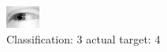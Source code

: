 \begin{figure}[h!]
\begin{center}
\includegraphics[width=0.60\columnwidth]{figures/ID2443_class_3_target_4.png}
\end{center}
\caption{ Classification: 3 actual target: 4}
\label{fig:ID2443_class_3_target_4}
\end{figure}
